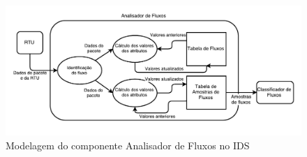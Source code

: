 \documentclass[cic,tc]{iiufrgs}
\begin{document}
\begin{figure}[h]
   \caption{Modelagem do componente Analisador de Fluxos no IDS}
   \begin{center}
       \includegraphics[width=34em]{modelanalyser}
   \end{center}
   \label{modelanalyser}
\end{figure}
\end{document}

